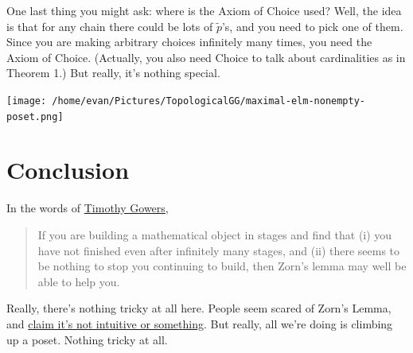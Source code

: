 One last thing you might ask:
where is the Axiom of Choice used?
Well, the idea is that for any chain there could be lots of $\tilde p$'s,
and you need to pick one of them.
Since you are making arbitrary choices infinitely many times, you need the Axiom of Choice.
(Actually, you also need Choice to talk about cardinalities as in Theorem 1.)
But really, it's nothing special.

\begin{center}
	\texttt{[image: /home/evan/Pictures/TopologicalGG/maximal-elm-nonempty-poset.png]}
\end{center}

\section{Conclusion}
In the words of \href{https://gowers.wordpress.com/2008/08/12/how-to-use-zorns-lemma/}{Timothy Gowers},
\begin{quote}
If you are building a mathematical object in stages and find that (i) you have not finished even after infinitely many stages, and (ii) there seems to be nothing to stop you continuing to build, then Zorn's lemma may well be able to help you.
\end{quote}
Really, there's nothing tricky at all here.
People seem scared of Zorn's Lemma,
and \href{http://math.stackexchange.com/questions/251726/simple-and-intuitive-example-for-zorns-lemma}{claim it's not intuitive or something}.
But really, all we're doing is climbing up a poset.
Nothing tricky at all.
